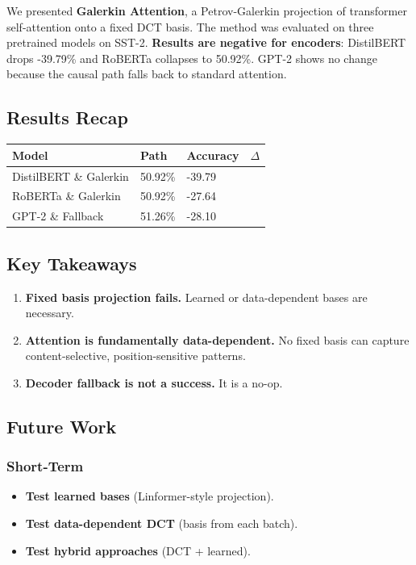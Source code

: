We presented \textbf{Galerkin Attention}, a Petrov-Galerkin projection of 
transformer self-attention onto a fixed DCT basis. The method was evaluated 
on three pretrained models on SST-2. \textbf{Results are negative for encoders}: 
DistilBERT drops -39.79\% and RoBERTa collapses to 50.92\%. GPT-2 
shows no change because the causal path falls back to standard attention.

\subsection{Results Recap}

\begin{table}[H]
\centering
\small
\begin{tabular}{llll}
\toprule
\textbf{Model} & \textbf{Path} & \textbf{Accuracy} & \textbf{$\Delta$} \\
\midrule
DistilBERT \& Galerkin & 50.92\% & -39.79 \\
RoBERTa \& Galerkin & 50.92\% & -27.64 \\
GPT-2 \& Fallback & 51.26\% & -28.10 \\
\bottomrule
\end{tabular}
\end{table}

\subsection{Key Takeaways}

\begin{enumerate}
\item \textbf{Fixed basis projection fails.} Learned or data-dependent bases are
  necessary.
\item \textbf{Attention is fundamentally data-dependent.} No fixed basis can capture
  content-selective, position-sensitive patterns.
\item \textbf{Decoder fallback is not a success.} It is a no-op.

\end{enumerate}
\subsection{Future Work}

\subsubsection{Short-Term}

\begin{itemize}
\item \textbf{Test learned bases} (Linformer-style projection).
\item \textbf{Test data-dependent DCT} (basis from each batch).
\item \textbf{Test hybrid approaches} (DCT + learned).

\end{itemize}
